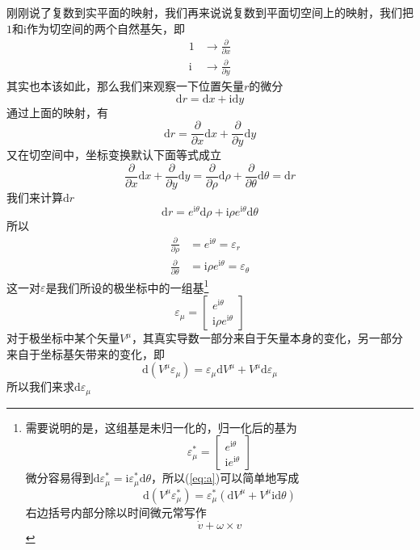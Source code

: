 \documentclass[UTF8]{ctexart}
\begin{document}
刚刚说了复数到实平面的映射，我们再来说说复数到平面切空间上的映射，我们把$1$和$\mathrm{i}$作为切空间的两个自然基矢，即
\begin{align*}
    1 &\rightarrow\frac{\partial }{\partial x} \\
    \mathrm{i} &\rightarrow \frac{\partial }{\partial y} 
\end{align*}
其实也本该如此，那么我们来观察一下位置矢量$r$的微分
\[\mathrm{d} r = \mathrm{d} x + \mathrm{i} \mathrm{d} y \]
通过上面的映射，有
\[\mathrm{d} r = \frac{\partial }{\partial x}\mathrm{d} x +  \frac{\partial }{\partial y}\mathrm{d} y \]
又在切空间中，坐标变换默认下面等式成立
\[\frac{\partial }{\partial x}\mathrm{d} x +  \frac{\partial }{\partial y}\mathrm{d} y=\frac{\partial }{\partial \rho}\mathrm{d} \rho +  \frac{\partial }{\partial \theta}\mathrm{d} \theta=\mathrm{d} r\]
我们来计算$\mathrm{d} r$
\[\mathrm{d} r = e^{\mathrm{i}\theta}\mathrm{d} \rho+\mathrm{i}\rho  e^{\mathrm{i}\theta}\mathrm{d}\theta\]
所以
\begin{align*}
    \frac{\partial }{\partial \rho} & = e^{\mathrm{i}\theta} = \varepsilon_r \\
    \frac{\partial }{\partial \theta}& = \mathrm{i}\rho  e^{\mathrm{i}\theta} = \varepsilon_\theta
\end{align*}
这一对\(\varepsilon \)是我们所设的极坐标中的一组基\footnote{需要说明的是，这组基是未归一化的，归一化后的基为\[\varepsilon^*_\mu=\begin{bmatrix}e^{\mathrm{i}\theta}\\\mathrm{i} e^{\mathrm{i}\theta}\end{bmatrix}\]微分容易得到\(\mathrm{d}\varepsilon^*_\mu=\mathrm{i} \varepsilon^*_\mu \mathrm{d} \theta\)，所以(\ref{eq:a})可以简单地写成\[\mathrm{d}(V^\mu \varepsilon^*_\mu)= \varepsilon^*_\mu(\mathrm{d} V^\mu + V^\mu\mathrm{i}  \mathrm{d} \theta)\]右边括号内部分除以时间微元常写作\[\dot{v}+\omega \times v\]}
\[\varepsilon_\mu =
\begin{bmatrix}
    e^{\mathrm{i}\theta}\\\mathrm{i}\rho  e^{\mathrm{i}\theta}
\end{bmatrix}\]
对于极坐标中某个矢量$V^\mu$，其真实导数一部分来自于矢量本身的变化，另一部分来自于坐标基矢带来的变化，即
\begin{equation}
    \mathrm{d}(V^\mu \varepsilon_\mu)= \varepsilon_\mu\mathrm{d} V^\mu + V^\mu\mathrm{d}\varepsilon_\mu \label{eq:a}
\end{equation}
所以我们来求\(\mathrm{d} \varepsilon_\mu\)
\end{document}
